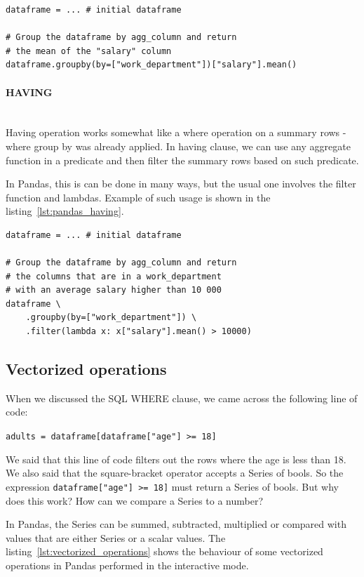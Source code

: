 \begin{lstlisting}[caption=Group by in Pandas, label={lst:pandas_groupby}, captionpos=b]
dataframe = ... # initial dataframe

# Group the dataframe by agg_column and return
# the mean of the "salary" column
dataframe.groupby(by=["work_department"])["salary"].mean()
\end{lstlisting}

\paragraph{HAVING} \leavevmode \\

Having operation works somewhat like a where operation on a summary rows - where group by was already applied.
In having clause, we can use any aggregate function in a predicate and then filter the summary rows based on such
predicate.

In Pandas, this is can be done in many ways, but the usual one involves the filter function and lambdas.
Example of such usage is shown in the listing~\ref{lst:pandas_having}.

\begin{lstlisting}[caption=Having in Pandas, label={lst:pandas_having}, captionpos=b]
dataframe = ... # initial dataframe

# Group the dataframe by agg_column and return
# the columns that are in a work_department
# with an average salary higher than 10 000
dataframe \
    .groupby(by=["work_department"]) \
    .filter(lambda x: x["salary"].mean() > 10000)
\end{lstlisting}


\subsection{Vectorized operations}

When we discussed the SQL WHERE clause, we came across the following line of code:

\verb|adults = dataframe[dataframe["age"] >= 18]|

We said that this line of code filters out the rows where the age is less than 18.
We also said that the square-bracket operator accepts a Series of bools.
So the expression \verb|dataframe["age"] >= 18]| must return a Series of bools.
But why does this work?
How can we compare a Series to a number?

In Pandas, the Series can be summed, subtracted, multiplied or compared with values that are either Series or a scalar
values.
The listing~\ref{lst:vectorized_operations} shows the behaviour of some vectorized operations in Pandas performed in
the interactive mode.

